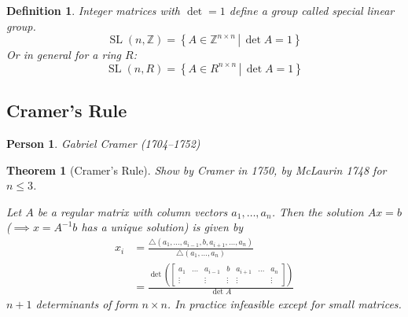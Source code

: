 \documentclass{article}
\newcounter{lecref}[section]
\numberwithin{lecref}{section}
\newtheorem{theorem}[lecref]{Theorem}
\newtheorem{definition}[lecref]{Definition}
\newtheorem*{person}{Person}
\newcommand{\setdef}[2]{\left\{\left.#1\,\right|\,#2\right\}}
\begin{document}
\begin{definition}
  Integer matrices with $\det = 1$ define a group called \emph{special linear group}.
  \[ \operatorname{SL}(n, \mathbb Z) = \setdef{A \in \mathbb Z^{n \times n}}{\det{A} = 1} \]
  Or in general for a ring $R$:
  \[ \operatorname{SL}(n, R) = \setdef{A \in R^{n \times n}}{\det{A} = 1} \]
\end{definition}

\subsection{Cramer's Rule}

\begin{person}
  Gabriel Cramer (1704--1752)
\end{person}

\begin{theorem}[Cramer's Rule]
  Show by Cramer in 1750, by McLaurin 1748 for $n \leq 3$.

  Let $A$ be a regular matrix with column vectors $a_1, \dots, a_n$.
  Then the solution $Ax = b$ ($\implies x = A^{-1} b$ has a unique solution) is given by
  \begin{align*}
    x_i &= \frac{\triangle (a_1, \dots, a_{i-1}, b, a_{i+1}, \dots, a_n)}{\triangle (a_1, \dots, a_n)} \\
        &= \frac{\det\left(\begin{bmatrix} a_1 & \dots & a_{i-1} & b & a_{i+1} & \dots & a_{n} \\ \vdots &  & \vdots & \vdots & \vdots & & \vdots \end{bmatrix}\right)}{\det{A}}
  \end{align*}
  $n+1$ determinants of form $n \times n$. In practice infeasible except for small matrices.
\end{theorem}
\end{document}
